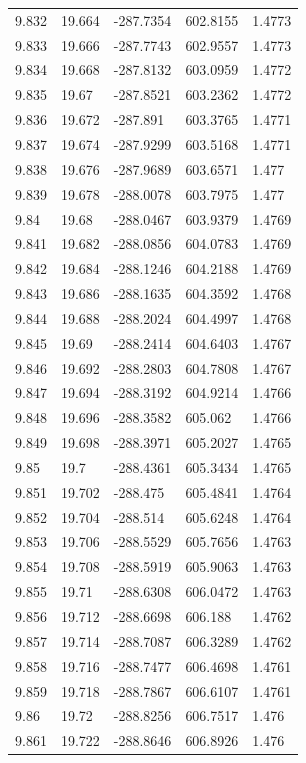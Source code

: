 \begin{tabular}{lllll}
9.832 & 19.664 & -287.7354 & 602.8155 & 1.4773 \\
9.833 & 19.666 & -287.7743 & 602.9557 & 1.4773 \\
9.834 & 19.668 & -287.8132 & 603.0959 & 1.4772 \\
9.835 & 19.67 & -287.8521 & 603.2362 & 1.4772 \\
9.836 & 19.672 & -287.891 & 603.3765 & 1.4771 \\
9.837 & 19.674 & -287.9299 & 603.5168 & 1.4771 \\
9.838 & 19.676 & -287.9689 & 603.6571 & 1.477 \\
9.839 & 19.678 & -288.0078 & 603.7975 & 1.477 \\
9.84 & 19.68 & -288.0467 & 603.9379 & 1.4769 \\
9.841 & 19.682 & -288.0856 & 604.0783 & 1.4769 \\
9.842 & 19.684 & -288.1246 & 604.2188 & 1.4769 \\
9.843 & 19.686 & -288.1635 & 604.3592 & 1.4768 \\
9.844 & 19.688 & -288.2024 & 604.4997 & 1.4768 \\
9.845 & 19.69 & -288.2414 & 604.6403 & 1.4767 \\
9.846 & 19.692 & -288.2803 & 604.7808 & 1.4767 \\
9.847 & 19.694 & -288.3192 & 604.9214 & 1.4766 \\
9.848 & 19.696 & -288.3582 & 605.062 & 1.4766 \\
9.849 & 19.698 & -288.3971 & 605.2027 & 1.4765 \\
9.85 & 19.7 & -288.4361 & 605.3434 & 1.4765 \\
9.851 & 19.702 & -288.475 & 605.4841 & 1.4764 \\
9.852 & 19.704 & -288.514 & 605.6248 & 1.4764 \\
9.853 & 19.706 & -288.5529 & 605.7656 & 1.4763 \\
9.854 & 19.708 & -288.5919 & 605.9063 & 1.4763 \\
9.855 & 19.71 & -288.6308 & 606.0472 & 1.4763 \\
9.856 & 19.712 & -288.6698 & 606.188 & 1.4762 \\
9.857 & 19.714 & -288.7087 & 606.3289 & 1.4762 \\
9.858 & 19.716 & -288.7477 & 606.4698 & 1.4761 \\
9.859 & 19.718 & -288.7867 & 606.6107 & 1.4761 \\
9.86 & 19.72 & -288.8256 & 606.7517 & 1.476 \\
9.861 & 19.722 & -288.8646 & 606.8926 & 1.476 \\

\end{tabular}
